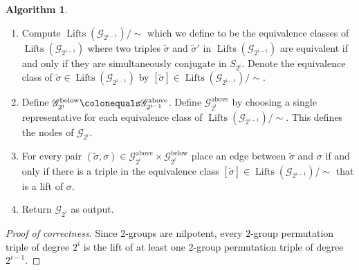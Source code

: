 \documentclass{dcthesis}
\newcommand{\wt}[1]{\widetilde{#1}}
\DeclareMathOperator{\Lifts}{Lifts}
\numberwithin{equation}{section}
\theoremstyle{definition}
\newtheorem{alg}[equation]{Algorithm}
\theoremstyle{remark}
\begin{document}
{{{\begin{alg}
\begin{enumerate}
\begin{equation}
            \Lifts(\mathscr{G}_{2^{i-1}})
            \colonequals\bigcup_{\sigma\in\mathscr{G}_{2^{i-1}}^\text{above}}\Lifts(\sigma)
          \end{equation}
        \item
          \label{alg:alltriplesiterationmodout}
          Compute
          $\Lifts(\mathscr{G}_{2^{i-1}})/\!\!\sim$
          which we define to be the equivalence
          classes of
          $\Lifts(\mathscr{G}_{2^{i-1}})$
          where two triples
          $\wt{\sigma}$ and $\wt{\sigma}'$
          in
          $\Lifts(\mathscr{G}_{2^{i-1}})$
          are equivalent
          if and only if
          they are simultaneously
          conjugate in $S_{2^{i}}$.
          Denote the equivalence class
          of $\wt{\sigma}\in
          \Lifts(\mathscr{G}_{2^{i-1}})$
          by $[\wt{\sigma}]\in
          \Lifts(\mathscr{G}_{2^{i-1}})/\!\!\sim$.
        \item
          \label{alg:alltriplesiterationnodes}
          Define
          $\mathscr{G}_{2^i}^\text{below}
          \colonequals\mathscr{G}_{2^{i-1}}^\text{above}$.
          Define
          $\mathscr{G}_{2^i}^\text{above}$
          by choosing a single representative
          for each equivalence class of
          $\Lifts(\mathscr{G}_{2^{i-1}})/\!\!\sim$.
          This defines
          the nodes of
          $\mathscr{G}_{2^i}$.
        \item
          \label{alg:alltriplesiterationedges}
          For every pair
          $(\wt{\sigma},\sigma)\in
          \mathscr{G}_{2^i}^\text{above}
          \times
          \mathscr{G}_{2^i}^\text{below}$
          place an edge between
          $\wt{\sigma}$ and $\sigma$
          if and only if
          there is a triple in the equivalence
          class $[\wt{\sigma}]\in
          \Lifts(\mathscr{G}_{2^{i-1}})/\!\!\sim$
          that is a lift of $\sigma$.
        \item
          \label{alg:alltriplesiterationreturn}
          Return
          $\mathscr{G}_{2^i}$
          as output.
      \end{enumerate}
    \end{alg}
    \begin{proof}[Proof of correctness]
      Since $2$-groups are nilpotent,
      every
      $2$-group permutation triple
      of degree $2^i$
      is the lift of at least one
      $2$-group permutation triple
      of degree $2^{i-1}$.

\end{proof}}}}
\end{document}
